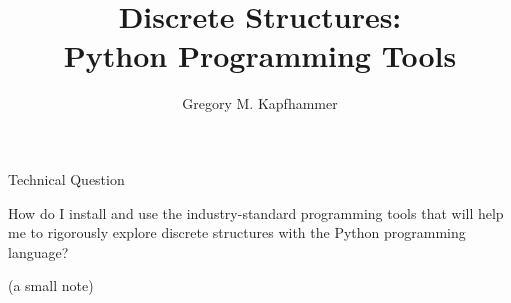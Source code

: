 \documentclass[14pt,aspectratio=169]{beamer}
\title{Discrete Structures: \\ Python Programming Tools}
\author{Gregory M. Kapfhammer}
\institute[shortinst]{Department of Computer Science, Allegheny College}
\begin{document}
{
  \begin{frame}
    \titlepage
  \end{frame}
}

\begin{frame}{Technical Question}

  \begin{center}
    How do I install and use the industry-standard programming tools that will
    help me to rigorously explore discrete structures with the Python
    programming language?
  \end{center}

  \vspace{2ex}
  \begin{center}
    \scriptsize (a small note)
  \end{center}

\end{frame}
\end{document}

